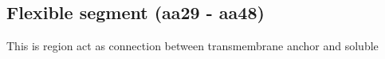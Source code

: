 \subsection{Flexible segment (aa29 - aa48)}

This is region act as connection between transmembrane anchor and soluble 

